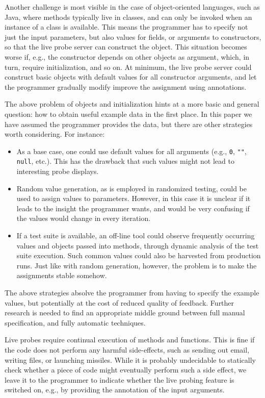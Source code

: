 \documentclass[english,submission]{programming}
\begin{document}
Another challenge is most visible in the case of object-oriented languages, such as Java, where methods typically live in classes, and can only be invoked when an instance of a class is available. This means the programmer has to specify not just the input parameters, but also values for fields, or arguments to constructors, so that the live probe server can construct the object. This situation becomes worse if, e.g., the constructor depends on other objects as argument, which, in turn, require initialization, and so on. At minimum, the live probe server could construct basic objects with default values for all constructor arguments, and let the programmer gradually modify improve the assignment using annotations. 

The above problem of objects and initialization hints at a more basic and general question: how to obtain useful example data in the first place. In this paper we have assumed the programmer provides the data, but there are other strategies worth considering. For instance:
\begin{itemize}
  \item As a base case, one could use default values for all arguments (e.g., \lstinline{0}, \lstinline{""}, \lstinline{null}, etc.). This has the drawback that such values might not lead to interesting probe displays. 
  \item Random value generation, as is employed in randomized testing, could be used to assign values to parameters. However, in this case it is unclear if it leads to the insight the programmer wants, and would be very confusing if the values would change in every iteration.
  \item If a test suite is available, an off-line tool could observe frequently occurring values and objects passed into methods, through dynamic analysis of the test suite execution. Such common values could also be harvested from production runs. Just like with random generation, however, the problem is to make the assignments stable somehow. 
\end{itemize}
The above strategies absolve the programmer from having to specify the example values, but potentially at the cost of reduced quality of feedback. Further research is needed to find an appropriate middle ground between full manual specification, and fully automatic techniques.

Live probes require continual execution of methods and functions. This is fine if the code does not perform any harmful side-effects, such as sending out email, writing files, or launching missiles. While it is probably undecidable to statically check whether a piece of code might eventually perform such a side effect, we leave it to the programmer to indicate whether the live probing feature is switched on, e.g., by providing the annotation of the input arguments. 
\end{document}
